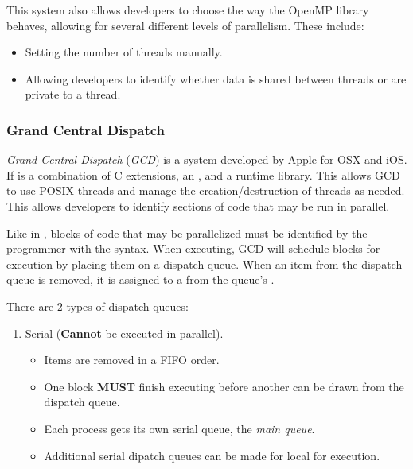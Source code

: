 This system also allows developers to choose the way the OpenMP library behaves, allowing for several different levels of parallelism.
These include:
\begin{itemize}[noitemsep]
\item Setting the number of threads manually.
\item Allowing developers to identify whether data is shared between threads or are private to a thread.
\end{itemize}

\subsubsection{Grand Central Dispatch}\label{subsubsec:Grand_Central_Dispatch}
\emph{Grand Central Dispatch} (\emph{GCD}) is a  system developed by Apple for OSX and iOS.\@
If is a combination of C extensions, an , and a runtime library.
This allows GCD to use POSIX threads and manage the creation/destruction of threads as needed.
This allows developers to identify sections of code that may be run in parallel.

Like in , blocks of code that may be parallelized must be identified by the programmer with the  syntax.
When executing, GCD will schedule blocks for execution by placing them on a dispatch queue.
When an item from the dispatch queue is removed, it is assigned to a  from the queue's .

There are 2 types of dispatch queues:
\begin{enumerate}[noitemsep]
\item Serial (\textbf{Cannot} be executed in parallel).
  \begin{itemize}[noitemsep]
  \item Items are removed in a FIFO order.
  \item One block \textbf{MUST} finish executing before another can be drawn from the dispatch queue.
  \item Each process gets its own serial queue, the \emph{main queue}.
  \item Additional serial dipatch queues can be made for local for execution.
  \end{itemize}
\end{enumerate}

